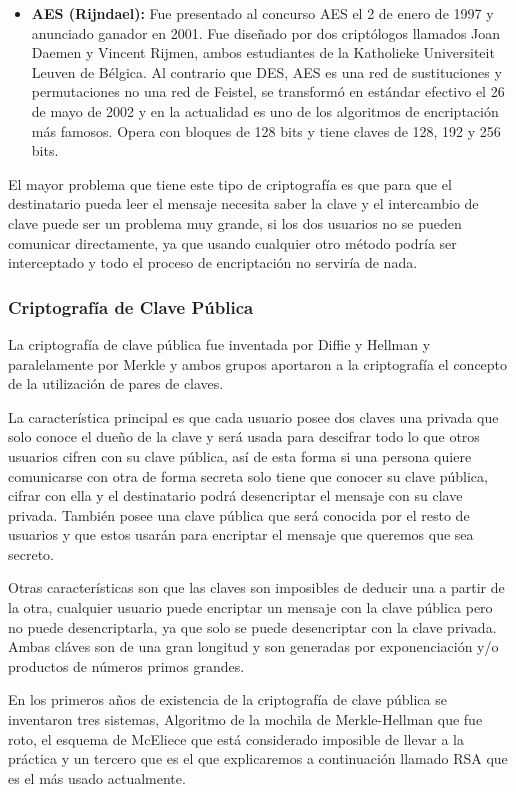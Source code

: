 \begin{itemize}
\item \textbf{AES (Rijndael):} Fue presentado al concurso AES el 2 de enero de 1997 y anunciado ganador en 2001. Fue diseñado por dos criptólogos llamados Joan Daemen y Vincent Rijmen, ambos estudiantes de la Katholieke Universiteit Leuven de Bélgica. Al contrario que DES, AES es una red de sustituciones y permutaciones no una red de Feistel, se transformó en estándar efectivo el 26 de mayo de 2002 y en la actualidad es uno de los algoritmos de encriptación más famosos. Opera con bloques de 128 bits y tiene claves de 128, 192 y 256 bits.

\end{itemize}

El mayor problema que tiene este tipo de criptografía es que para que el destinatario pueda leer el mensaje necesita saber la clave y el intercambio de clave puede ser un problema muy grande, si los dos usuarios no se pueden comunicar directamente, ya que usando cualquier otro método podría ser interceptado y todo el proceso de encriptación no serviría de nada.

\subsubsection*{Criptografía de Clave Pública}

La criptografía de clave pública fue inventada por Diffie y Hellman y paralelamente por Merkle y ambos grupos aportaron a la criptografía el concepto de la utilización de pares de claves.

La característica principal es que cada usuario posee dos claves una privada que solo conoce el dueño de la clave y será usada para descifrar todo lo que otros usuarios cifren con su clave pública, así de esta forma si una persona quiere comunicarse con otra de forma secreta solo tiene que conocer su clave pública, cifrar con ella y el destinatario podrá desencriptar el mensaje con su clave privada. También posee una clave pública que será conocida por el resto de usuarios y que estos usarán para encriptar el mensaje que queremos que sea secreto. 

Otras características son que las claves son imposibles de deducir una a partir de la otra, cualquier usuario puede encriptar un mensaje con la clave pública pero no puede desencriptarla, ya que solo se puede desencriptar con la clave privada. Ambas cláves son de una gran longitud y son generadas por exponenciación y/o productos de números primos grandes.

En los primeros años de existencia de la criptografía de clave pública se inventaron tres sistemas, Algoritmo de la mochila de Merkle-Hellman que fue roto, el esquema de McEliece que está considerado imposible de llevar a la práctica y un tercero que es el que explicaremos a continuación llamado RSA que es el más usado actualmente.

